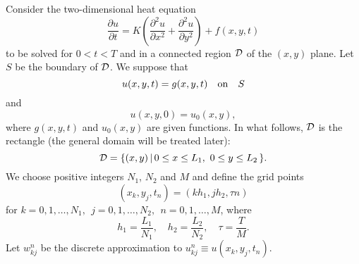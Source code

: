 Consider the two-dimensional heat equation
\begin{equation}
\frac{\partial u}{\partial t}=K\left(\frac{\partial^{2}u}{\partial
x^{2}} +\frac{\partial^{2}u}{\partial y^{2}}\right)+f(x,y,t) \label{f1}
\end{equation}
to be solved for $0 < t < T$ and in a connected region ${\cal D}$ of
the $(x, y)$ plane. Let $S$ be the boundary of ${\cal D}$. We
suppose that
\begin{equation}
u(x, y, t) = g(x, y, t) \quad {\rm on} \quad S \label{f2}
\end{equation}
and
\begin{equation}
u(x, y, 0) = u_{0}(x, y), \label{f3}
\end{equation}
where $g(x, y, t)$ and $ u_{0}(x, y)$ are given functions.
In what follows, ${\cal D}$ is the rectangle (the general domain
will be treated later):
\[
{\cal D}=\{(x,y) \, \vert \, 0\leq x\leq L_{1}, \ 0\leq y\leq L_{2}  \, \}.
\]
We choose positive integers $N_{1}$, $N_{2}$ and
$M$ and define the grid points
\[
(x_{k},y_{j},t_{n})=(kh_{1},jh_{2}, \tau n)
\]
for $k=0,1,\dots, N_{1}, \ \ j=0,1,\dots, N_{2}, \ \ n=0,1,\dots, M$,
where
\[
h_{1}=\frac{L_{1}}{N_{1}}, \quad h_{2}=\frac{L_{2}}{N_{2}}, \quad
\tau=\frac{T}{M}.
\]
Let $w_{kj}^{n}$ be the discrete approximation to
$u_{kj}^n\equiv u(x_{k},y_{j},t_{n})$. 

